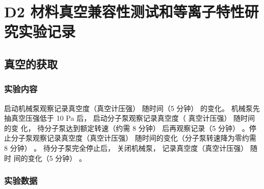 \documentclass[dvipsnames, svgnames,a4paper,11pt]{article}
\begin{document}
	\section{ D2 材料真空兼容性测试和等离子特性研究\quad\heiti 实验记录}
	\subsection{真空的获取}
	\subsubsection{实验内容}
启动机械泵观察记录真空度（真空计压强） 随时间（5 分钟） 的变化。 机械泵先
		抽真空压强低于 10 Pa 后， 启动分子泵观察记录真空度（ 真空计压强） 随时间的变
		化， 待分子泵达到额定转速（约需 8 分钟） 后再观察记录（5 分钟） 。停止分子泵观察记录真空度（真空计压强） 随时间的变化（分子泵转速降为零约需 8 分钟） 。 待分子泵完全停止后， 关闭机械泵， 记录真空度（真空计压强） 随时
		间的变化（5 分钟） 。

	\subsubsection{实验数据}
	
\end{document}
